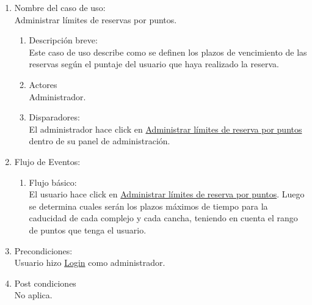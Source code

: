 \documentclass[a4paper,11pt]{article}
\begin{document}
\begin{enumerate}

    \item Nombre del caso de uso: \\
    Administrar límites de reservas por puntos.

    \begin{enumerate}
    \item Descripción breve: \\
        Este caso de uso describe como se definen los plazos de vencimiento de
        las reservas según el puntaje del usuario que haya realizado la reserva.
    \item Actores \\
        Administrador.
    \item Disparadores: \\
        El administrador hace click en 
        \underline{Administrar límites de reserva por puntos}
        dentro de su panel de administración.
    \end{enumerate}

    \item Flujo de Eventos: \\

    \begin{enumerate}

        \item Flujo básico:\\
            El usuario hace click en \underline{Administrar límites de reserva
            por puntos}.
            Luego se determina cuales serán los plazos máximos de tiempo para la
            caducidad de cada complejo y cada cancha, teniendo en cuenta el rango
            de puntos que tenga el usuario.
    \end{enumerate}

    \item Precondiciones: \\
        Usuario hizo \underline{Login} como administrador.

    \item Post condiciones \\
        No aplica.
        
\end{enumerate}


\end{document}
